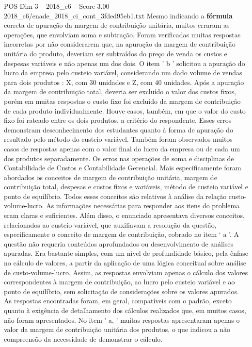 \begin{textsample}{POS Dim 3 – 2018\_c6 – Score 3.00 – 2018\_c6/enade\_2018\_ci\_cont\_3fded95eb1.txt}
Mesmo indicando a \textbf{fórmula} correta de apuração da margem de contribuição unitária, muitos erraram as operações, que envolviam soma e subtração.
Foram verificadas muitas respostas incorretas por não considerarem que, na apuração da margem de contribuição unitária do produto, deveriam ser subtraídos do preço de venda os custos e despesas variáveis e não apenas um dos dois.
O item ' b ' solicitou a apuração do lucro da empresa pelo custeio variável, considerando um dado volume de vendas para dois produtos : X, com 30 unidades e Z, com 40 unidades.
Após a apuração da margem de contribuição total, deveria ser excluído o valor dos custos fixos, porém em muitas respostas o custo fixo foi excluído da margem de contribuição de cada produto individualmente.
Houve casos, também, em que o valor do custo fixo foi rateado entre os dois produtos, a critério do respondente.
Esses erros demonstram desconhecimento dos estudantes quanto à forma de apuração do resultado pelo método do custeio variável.
Também foram observados muitos casos de respostas apenas com o valor final do lucro da empresa ou de cada um dos produtos separadamente.
Os erros nas operações de soma e disciplinas de Contabilidade de Custos e Contabilidade Gerencial.
Mais especificamente foram abordados os conceitos de margem de contribuição unitária, margem de contribuição total, despesas e custos fixos e variáveis, método de custeio variável e ponto de equilíbrio.
Todos esses conceitos são relativos à análise da relação custo-volume-lucro.
As informações necessárias para responder aos itens do problema eram claras e suficientes.
Além disso, o enunciado apresentava diversos conceitos, relacionados ao custeio variável, que auxiliavam a resolução da questão, especificamente o conceito de margem de contribuição, cobrado no item ‘ a ’.
A questão não requeria conteúdos aprofundados ou desenvolvimento de análises apuradas.
Era bastante simples, com um nível de profundidade básico, pela ênfase no cálculo de valores, a partir da aplicação de uma lógica conceitual sobre análise de custo-volume-lucro.
Assim, as respostas envolviam apenas o cálculo dos valores correspondentes à margem de contribuição, ao lucro pelo custeio variável e ao ponto de equilíbrio, sem solicitação de considerações sobre os valores apurados.
As respostas encontradas foram, em geral, compatíveis com o padrão, exceto quanto à exigência de detalhamento dos cálculos realizados que, em muitos casos, não foram apresentados.
No item ' a, ' muitas respostas apresentaram apenas o valor da margem de contribuição unitária dos produtos, o que indicou a não compreensão da necessidade de demonstrar o cálculo.

\end{textsample}
